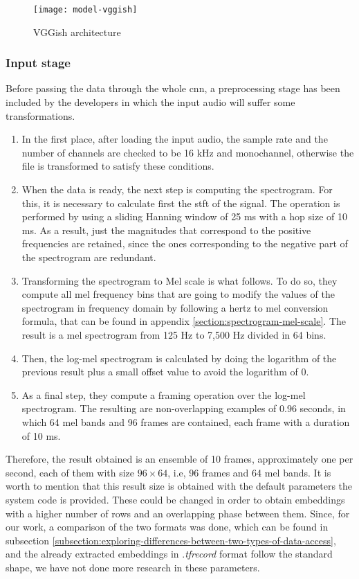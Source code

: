	\begin{figure}
		\centering
		\captionsetup{justification=centering}
		\texttt{[image: model-vggish]}
		\caption{VGGish architecture}
		\label{fig:mesh2}
	\end{figure}

\subsubsection*{Input stage}

	Before passing the data through the whole \acrshort{cnn}, a preprocessing stage has been included by the developers in which the input audio will suffer some transformations. 

	\begin{enumerate}
		\item In the first place, after loading the input audio, the sample rate and the number of channels are checked to be 16 kHz and monochannel, otherwise the file is transformed to satisfy these conditions.
		\item When the data is ready, the next step is computing the spectrogram. For this, it is necessary to calculate first the \acrfull{stft} of the signal. The operation is performed by using a sliding Hanning window of 25 ms with a hop size of 10 ms. As a result, just the magnitudes that correspond to the positive frequencies are retained, since the ones corresponding to the negative part of the spectrogram are redundant.
		\item  Transforming the spectrogram to Mel scale is what follows. To do so, they compute all mel frequency bins that are going to modify the values of the spectrogram in frequency domain by following a hertz to mel conversion formula, that can be found in appendix \ref{section:spectrogram-mel-scale}. The result is a mel spectrogram from 125 Hz to 7,500 Hz divided in 64 bins.
		\item Then, the log-mel spectrogram is calculated by doing the logarithm of the previous result plus a small offset value to avoid the logarithm of $0$.
		\item As a final step, they compute a framing operation over the log-mel spectrogram. The resulting are non-overlapping examples of 0.96 seconds, in which 64 mel bands and 96 frames are contained, each frame with a duration of 10 ms.
	\end{enumerate}

	Therefore, the result obtained is an ensemble of 10 frames, approximately one per second, each of them with size $96 \times 64$, i.e, 96 frames and 64 mel bands. It is worth to mention that this result size is obtained with the default parameters the system code is provided. These could be changed in order to obtain embeddings with a higher number of rows and an overlapping phase between them. Since, for our work, a comparison of the two formats was done, which can be found in subsection \ref{subsection:exploring-differences-between-two-types-of-data-access}, and the already extracted embeddings in .\textit{tfrecord} format follow the standard shape, we have not done more research in these parameters. 


